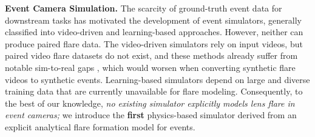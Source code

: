 \noindent\textbf{Event Camera Simulation.}
The scarcity of ground-truth event data for downstream tasks \cite{bhattacharya2025monocular,messikommer2025data,pellerito2024deep,muglikar2023event} has motivated the development of event simulators, generally classified into video-driven and learning-based approaches. However, neither can produce paired flare data. The video-driven simulators \cite{rebecq2018esim,hu2021v2e,gehrig2020video,joubert2021event,lin2022dvs,han2024physical} rely on input videos, but paired video flare datasets do not exist, and these methods already suffer from notable sim-to-real gaps \cite{stoffregen2020reducing}, which would worsen when converting synthetic flare videos to synthetic events. Learning-based simulators \cite{zhang2023v2ce,pantho2022event,baek2020real,rizzo2022event,zhu2021eventgan,gu2021learn} depend on large and diverse training data that are currently unavailable for flare modeling. Consequently, to the best of our knowledge, \emph{no existing simulator explicitly models lens flare in event cameras;} we introduce the \textbf{first} physics-based simulator derived from an explicit analytical flare formation model for events.










